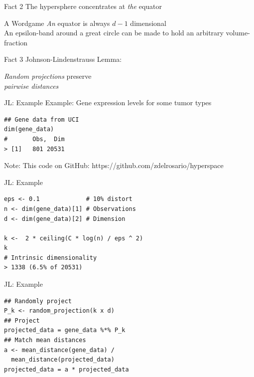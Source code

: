\documentclass[14pt]{beamer}
\begin{document}
\begin{frame}{Fact 2}
  The hypersphere concentrates at \emph{the} equator
\end{frame}


\begin{frame}{A Wordgame}
  \emph{An} equator is always $d-1$ dimensional \\

  \bigskip An epsilon-band around a great circle can be made to hold an
  arbitrary volume-fraction
\end{frame}


\begin{frame}{Fact 3}
  Johnson-Lindenstrauss Lemma:

  \bigskip \emph{Random projections} preserve \\
  \emph{pairwise distances}
\end{frame}

\begin{frame}[fragile]{JL: Example}
Example: Gene expression levels for some tumor types

\bigskip
  \begin{lstlisting}
## Gene data from UCI
dim(gene_data)
#       Obs,  Dim
> [1]   801 20531
  \end{lstlisting}

  \bigskip
  Note: This code on GitHub: https://github.com/zdelrosario/hyperspace
\end{frame}

\begin{frame}[fragile]{JL: Example}
  \begin{lstlisting}
eps <- 0.1             # 10% distort
n <- dim(gene_data)[1] # Observations
d <- dim(gene_data)[2] # Dimension

k <-  2 * ceiling(C * log(n) / eps ^ 2)
k
# Intrinsic dimensionality
> 1338 (6.5% of 20531)
  \end{lstlisting}
\end{frame}

\begin{frame}[fragile]{JL: Example}
  \begin{lstlisting}
## Randomly project
P_k <- random_projection(k x d)
## Project
projected_data = gene_data %*% P_k
## Match mean distances
a <- mean_distance(gene_data) /
  mean_distance(projected_data)
projected_data = a * projected_data
  \end{lstlisting}
\end{frame}
\end{document}
